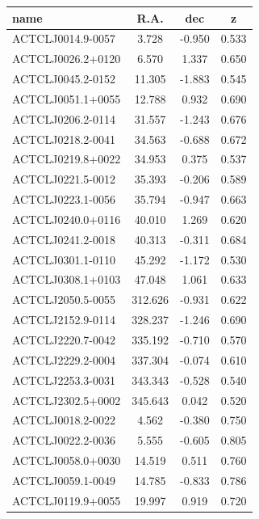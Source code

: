 \documentclass[11pt,a4paper,twoside,graphicx,color]{article}
\begin{document}
\begin{table}
\begin{tabular}{|l  || c | c | c | }
  \hline                       
name  &  R.A.  & dec  &   z \\ \hline
   ACTCLJ0014.9-0057   &  3.728  &  -0.950 &   0.533 \\ \hline
  ACTCLJ0026.2+0120 &   6.570 &   1.337 &   0.650 \\ \hline
  ACTCLJ0045.2-0152 &  11.305 &  -1.883 &   0.545 \\ \hline
  ACTCLJ0051.1+0055 &  12.788 &   0.932 &   0.690 \\ \hline
  ACTCLJ0206.2-0114 &  31.557 &  -1.243 &   0.676 \\ \hline
  ACTCLJ0218.2-0041 &  34.563 &  -0.688 &   0.672 \\ \hline
  ACTCLJ0219.8+0022 &  34.953 &   0.375 &   0.537 \\ \hline
  ACTCLJ0221.5-0012 &  35.393 &  -0.206 &   0.589 \\ \hline
  ACTCLJ0223.1-0056 &  35.794 &  -0.947 &   0.663 \\ \hline
  ACTCLJ0240.0+0116 &  40.010 &   1.269 &   0.620 \\ \hline
  ACTCLJ0241.2-0018 &  40.313 &  -0.311 &   0.684 \\ \hline
  ACTCLJ0301.1-0110 &  45.292 &  -1.172 &   0.530 \\ \hline
  ACTCLJ0308.1+0103 &  47.048 &   1.061 &   0.633 \\ \hline
  ACTCLJ2050.5-0055 & 312.626 &  -0.931 &   0.622 \\ \hline
  ACTCLJ2152.9-0114 & 328.237 &  -1.246 &   0.690 \\ \hline
  ACTCLJ2220.7-0042 & 335.192 &  -0.710 &   0.570 \\ \hline
  ACTCLJ2229.2-0004 & 337.304 &  -0.074 &   0.610 \\ \hline
  ACTCLJ2253.3-0031 & 343.343 &  -0.528 &   0.540 \\ \hline
  ACTCLJ2302.5+0002 & 345.643 &   0.042 &   0.520 \\ \hline
  ACTCLJ0018.2-0022 &   4.562 &  -0.380 &   0.750 \\ \hline
  ACTCLJ0022.2-0036 &   5.555 &  -0.605 &   0.805 \\ \hline
  ACTCLJ0058.0+0030 &  14.519 &   0.511 &   0.760 \\ \hline
  ACTCLJ0059.1-0049 &  14.785 &  -0.833 &   0.786 \\ \hline
  ACTCLJ0119.9+0055 &  19.997 &   0.919 &   0.720 \\ \hline

\end{tabular}
\end{table}
\end{document}

